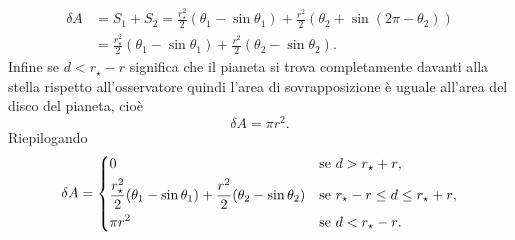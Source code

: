 \begin{equation}
  \begin{split}
    \delta A &= S_1 + S_2 = \frac{r_\star^2}{2}(\theta_1 - \sin\theta_1) +
    \frac{r^2}{2}(\theta_2 + \sin(2\pi -\theta_2)) \\
    &= \frac{r_\star^2}{2}(\theta_1 - \sin\theta_1) + \frac{r^2}{2}(\theta_2 -
    \sin\theta_2).
  \end{split}
\end{equation}
Infine se $d < r_\star - r$ significa che il pianeta si trova completamente
davanti alla stella rispetto all'osservatore quindi l'area di sovrapposizione è
uguale all'area del disco del pianeta, cioè
\begin{equation}
  \delta A = \pi r^2.
\end{equation}
Riepilogando
\begin{equation}
  \delta A =
  \begin{dcases}
    0 & \text{se $d > r_\star + r$}, \\
    \frac{r_\star^2}{2}(\theta_1 - \sin\theta_1) + \frac{r^2}{2}(\theta_2 -
    \sin\theta_2) & \text{se $r_\star - r \leq d \leq r_\star + r$}, \\
    \pi r^2 & \text{se $d < r_\star - r$}.
  \end{dcases}
\end{equation}

